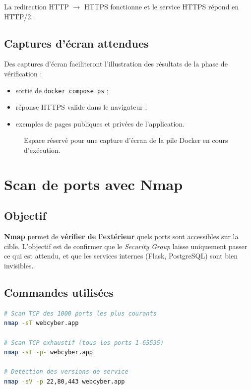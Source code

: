 La redirection HTTP \(\to\) HTTPS fonctionne et le service HTTPS répond
en HTTP/2.

\subsection{Captures d'écran attendues}

Des captures d'écran faciliteront l'illustration des résultats de la phase
de vérification :

\begin{itemize}
  \item sortie de \texttt{docker compose ps} ;
  \item réponse HTTPS valide dans le navigateur ;
  \item exemples de pages publiques et privées de l'application.
\end{itemize}

\begin{figure}[H]
  \centering
  \caption{Espace réservé pour une capture d'écran de la pile Docker en cours d'exécution.}
  \label{fig:screenshot-docker}
\end{figure}

\section{Scan de ports avec Nmap}

\subsection{Objectif}

\textbf{Nmap} permet de \textbf{vérifier de l'extérieur} quels ports
sont accessibles sur la cible. L'objectif est de confirmer que le
\emph{Security Group} laisse uniquement passer ce qui est attendu, et
que les services internes (Flask, PostgreSQL) sont bien invisibles.

\subsection{Commandes utilisées}

\begin{lstlisting}[language=bash, caption={Scans Nmap depuis une machine externe.}]
# Scan TCP des 1000 ports les plus courants
nmap -sT webcyber.app

# Scan TCP exhaustif (tous les ports 1-65535)
nmap -sT -p- webcyber.app

# Detection des versions de service
nmap -sV -p 22,80,443 webcyber.app
\end{lstlisting}

